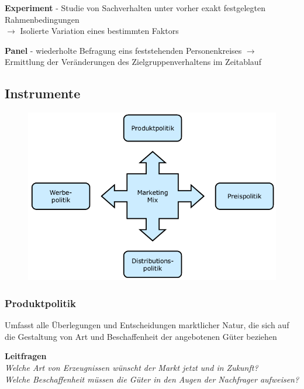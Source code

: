 \documentclass[a4paper,11pt, twoside]{article}
\begin{document}
\textbf{Experiment} - Studie von Sachverhalten unter vorher exakt festgelegten Rahmenbedingungen\\
$\rightarrow$ Isolierte Variation eines bestimmten Faktors

\textbf{Panel} - wiederholte Befragung eins feststehenden Personenkreises
$\rightarrow$ Ermittlung der Veränderungen des Zielgruppenverhaltens im Zeitablauf

\subsection{Instrumente}

\begin{figure}[h]
 \begin{center}
   \includegraphics[scale=0.3]{bilder/instrumente_produktpolitik.png}
 \end{center}
\end{figure}

\subsubsection{Produktpolitik}
Umfasst alle Überlegungen und Entscheidungen marktlicher Natur, die sich auf die Gestaltung von Art und Beschaffenheit der angebotenen Güter beziehen

\textbf{Leitfragen}\\
\textit{Welche Art von Erzeugnissen wünscht der Markt jetzt und in Zukunft?}\\
\textit{Welche Beschaffenheit müssen die Güter in den Augen der Nachfrager aufweisen?}
\end{document}
